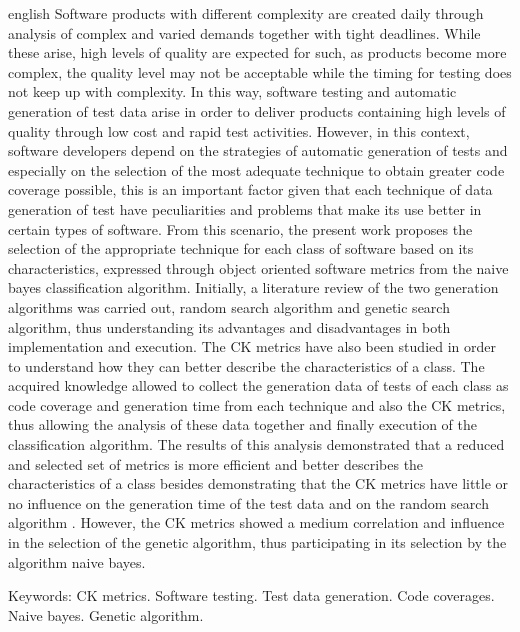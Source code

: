 \documentclass[
	12pt,				%
	oneside,			%
	a4paper,			%
	english,			%
	brazil				%
	]{abntex2ppgsi}
\begin{document}
\begin{resumo}[Abstract]
\begin{otherlanguage*}{english}
Software products with different complexity are created daily through analysis of complex and varied demands together with tight deadlines. While these arise, high levels of quality are expected for such, as products become more complex, the quality level may not be acceptable while the timing for testing does not keep up with complexity. In this way, software testing and automatic generation of test data arise in order to deliver products containing high levels of quality through low cost and rapid test activities. However, in this context, software developers depend on the strategies of automatic generation of tests and especially on the selection of the most adequate technique to obtain greater code coverage possible, this is an important factor given that each technique of data generation of test have peculiarities and problems that make its use better in certain types of software. From this scenario, the present work proposes the selection of the appropriate technique for each class of software based on its characteristics, expressed through object oriented software metrics from the naive bayes classification algorithm.
Initially, a literature review of the two generation algorithms was carried out, random search algorithm and genetic search algorithm, thus understanding its advantages and disadvantages in both implementation and execution. The CK metrics have also been studied in order to understand how they can better describe the characteristics of a class. The acquired knowledge allowed to collect the generation data of tests of each class as code coverage and generation time from each technique and also the CK metrics, thus allowing the analysis of these data together and finally execution of the classification algorithm. The results of this analysis demonstrated that a reduced and selected set of metrics is more efficient and better describes the characteristics of a class besides demonstrating that the CK metrics have little or no influence on the generation time of the test data and on the random search algorithm . However, the CK metrics showed a medium correlation and influence in the selection of the genetic algorithm, thus participating in its selection by the algorithm naive bayes.

Keywords: CK metrics. Software testing. Test data generation. Code coverages. Naive bayes. Genetic algorithm.
\end{otherlanguage*}
\end{resumo}

\listoffigures*
\cleardoublepage
\end{document}
